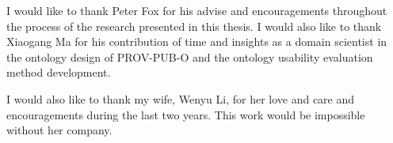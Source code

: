  

I would like to thank Peter Fox for his advise and encouragements throughout the process of the research presented in this thesis. I would also like to thank Xiaogang Ma for his contribution of time and insights as a domain scientist in the ontology design of PROV-PUB-O and the ontology usability evaluation method development.

I would also like to thank my wife, Wenyu Li, for her love and care and encouragements during the last two years. This work would be impossible without her company.

